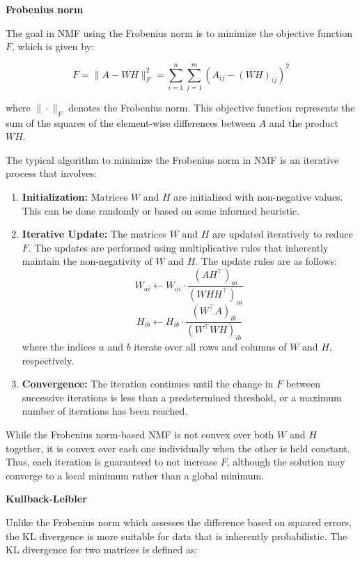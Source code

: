 \documentclass{article}
\begin{document}
\textbf{Frobenius norm}

The goal in NMF using the Frobenius norm is to minimize the objective function \( F \), which is given by:

\[
    F = \| A - WH \|_F^2 = \sum_{i=1}^{n} \sum_{j=1}^{m} (A_{ij} - (WH)_{ij})^2
\]

where \( \| \cdot \|_F \) denotes the Frobenius norm. This objective function represents the sum of the squares of the element-wise differences between \( A \) and the product \( WH \).

The typical algorithm to minimize the Frobenius norm in NMF is an iterative process that involves:

\begin{enumerate}
    \item \textbf{Initialization:} Matrices \( W \) and \( H \) are initialized with non-negative values. This can be done randomly or based on some informed heuristic.
    \item \textbf{Iterative Update:} The matrices \( W \) and \( H \) are updated iteratively to reduce \( F \). The updates are performed using multiplicative rules that inherently maintain the non-negativity of \( W \) and \( H \). The update rules are as follows:
          \[
              W_{ai} \leftarrow W_{ai} \cdot \frac{(AH^\top)_{ai}}{(WHH^\top)_{ai}}
          \]
          \[
              H_{ib} \leftarrow H_{ib} \cdot \frac{(W^\top A)_{ib}}{(W^\top WH)_{ib}}
          \]
          where the indices \( a \) and \( b \) iterate over all rows and columns of \( W \) and \( H \), respectively.
    \item \textbf{Convergence:} The iteration continues until the change in \( F \) between successive iterations is less than a predetermined threshold, or a maximum number of iterations has been reached.
\end{enumerate}

While the Frobenius norm-based NMF is not convex over both \( W \) and \( H \) together, it is convex over each one individually when the other is held constant. Thus, each iteration is guaranteed to not increase \( F \), although the solution may converge to a local minimum rather than a global minimum.

\textbf{Kullback-Leibler}

Unlike the Frobenius norm which assesses the difference based on squared errors, the KL divergence is more suitable for data that is inherently probabilistic. The KL divergence for two matrices is defined as:
\end{document}
